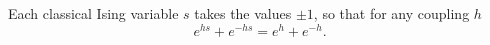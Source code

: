 \documentclass{article}
\begin{document}
Each classical Ising variable $s$ takes the values $\pm 1$, so that for any coupling $h$
\begin{equation}
e^{h s} + e^{-h s} = e^{h} + e^{-h} .
\label{eq:z1}
\end{equation}
\end{document}
